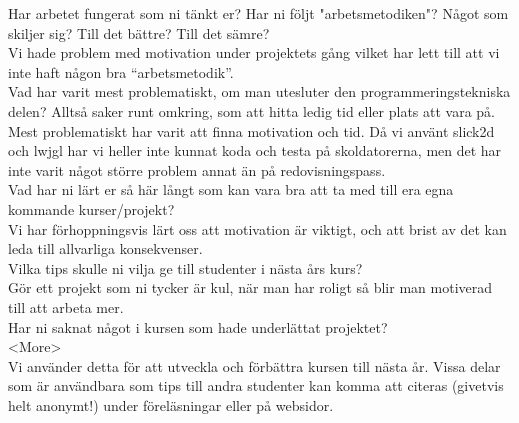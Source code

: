 {\color{red}Har arbetet fungerat som ni tänkt er? Har ni följt "arbetsmetodiken"? Något som skiljer sig? Till det bättre? Till det sämre?\\}
Vi hade problem med motivation under projektets gång vilket har lett till att vi inte haft någon bra ``arbetsmetodik''.\\
{\color{red}Vad har varit mest problematiskt, om man utesluter den programmeringstekniska delen? Alltså saker runt omkring, som att hitta ledig tid eller plats att vara på.\\}
Mest problematiskt har varit att finna motivation och tid. Då vi använt slick2d och lwjgl har vi heller inte kunnat koda och testa på skoldatorerna, men det har inte varit något större problem annat än på redovisningspass.\\

{\color{red}Vad har ni lärt er så här långt som kan vara bra att ta med till era egna kommande kurser/projekt?\\}
Vi har förhoppningsvis lärt oss att motivation är viktigt, och att brist av det kan leda till allvarliga konsekvenser.\\
{\color{red}Vilka tips skulle ni vilja ge till studenter i nästa års kurs?\\}
Gör ett projekt som ni tycker är kul, när man har roligt så blir man motiverad till att arbeta mer.\\
{\color{red}Har ni saknat något i kursen som hade underlättat projektet?\\}
<More>\\
{\color{red}Vi använder detta för att utveckla och förbättra kursen till nästa år.  Vissa delar som är användbara som tips till andra studenter kan komma att citeras (givetvis helt anonymt!) under föreläsningar eller på websidor.\\}
